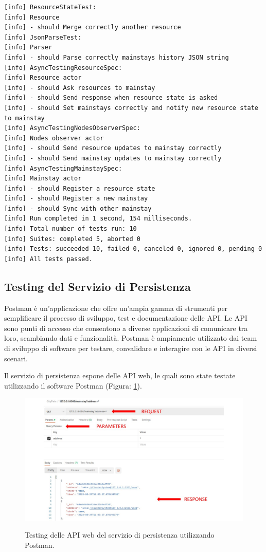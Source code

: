\documentclass{scrartcl}
\begin{document}
\begin{lstlisting}
[info] ResourceStateTest:
[info] Resource
[info] - should Merge correctly another resource
[info] JsonParseTest:
[info] Parser
[info] - should Parse correctly mainstays history JSON string
[info] AsyncTestingResourceSpec:
[info] Resource actor
[info] - should Ask resources to mainstay
[info] - should Send response when resource state is asked
[info] - should Set mainstays correctly and notify new resource state to mainstay
[info] AsyncTestingNodesObserverSpec:
[info] Nodes observer actor
[info] - should Send resource updates to mainstay correctly
[info] - should Send mainstay updates to mainstay correctly
[info] AsyncTestingMainstaySpec:
[info] Mainstay actor
[info] - should Register a resource state
[info] - should Register a new mainstay
[info] - should Sync with other mainstay
[info] Run completed in 1 second, 154 milliseconds.
[info] Total number of tests run: 10
[info] Suites: completed 5, aborted 0
[info] Tests: succeeded 10, failed 0, canceled 0, ignored 0, pending 0
[info] All tests passed.

\end{lstlisting}

\subsection{Testing del Servizio di Persistenza}

Postman\cite{postman} è un'applicazione che offre un'ampia gamma di strumenti per semplificare il processo di sviluppo, test e documentazione delle API. Le API sono punti di accesso che consentono a diverse applicazioni di comunicare tra loro, scambiando dati e funzionalità. Postman è ampiamente utilizzato dai team di sviluppo di software per testare, convalidare e interagire con le API in diversi scenari.

Il servizio di persistenza espone delle API web, le quali sono state testate utilizzando il software Postman (Figura: \ref{fig:postman}).

\begin{figure}[H]
    \caption{Testing delle API web del servizio di persistenza utilizzando Postman.}
    \includegraphics[width=\textwidth]{../assets/images/postman.jpg}
    \label{fig:postman}
\end{figure}
\end{document}
